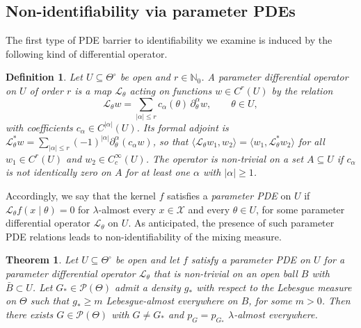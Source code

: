 \documentclass[11pt,twoside]{article} %
\newtheorem{theorem}{Theorem}
\newtheorem{definition}{Definition}
\begin{document}
\subsection{Non-identifiability via parameter PDEs}\label{sec:homogeneous}

The first type of PDE barrier to identifiability we examine is induced by the following kind of differential operator.

\begin{definition}\label{def:operator}
Let $U\subseteq\Theta^\circ$ be open and $r\in\mathbb N_0$. A \emph{parameter differential operator} on $U$ of order $r$ is a map $\mathcal L_\theta$ acting on functions $w\in C^r(U)$ by the relation
%
\begin{equation*}
    \mathcal L_\theta w=\sum_{|\alpha|\le r}c_\alpha(\theta)\,\partial^\alpha_\theta w, \qquad \theta\in U,
\end{equation*}
%
with coefficients $c_\alpha\in C^{|\alpha|}(U)$. Its formal adjoint is $\mathcal L^*_\theta w=\sum_{|\alpha|\le r}(-1)^{|\alpha|}\partial^\alpha_\theta(c_\alpha w)$, so that $\langle\mathcal L_\theta w_1,w_2\rangle=\langle w_1,\mathcal L^*_\theta w_2\rangle$ for all $w_1\in C^r(U)$ and $w_2\in C_c^\infty(U)$. The operator is \emph{non-trivial} on a set $A\subseteq U$ if $c_\alpha$ is not identically zero on $A$ for at least one $\alpha$ with $|\alpha|\ge1$.
\end{definition}

Accordingly, we say that the kernel $f$ satisfies a \emph{parameter PDE} on $U$ if $\mathcal L_\theta f(x\mid\theta)=0$ for $\lambda$-almost every $x\in\mathcal X$ and every $\theta\in U$, for some parameter differential operator $\mathcal L_\theta$ on $U$. As anticipated, the presence of such parameter PDE relations leads to non-identifiability of the mixing measure.

\begin{theorem}\label{thm:homogeneous}
Let $U\subseteq\Theta^\circ$ be open and let $f$ satisfy a parameter PDE on $U$ for a parameter differential operator $\mathcal L_\theta$ that is non-trivial on an open ball $B$ with $\bar B\subset U$. Let $G_*\in\mathcal P(\Theta)$ admit a density $g_*$ with respect to the Lebesgue measure on $\Theta$ such that $g_*\ge m$ Lebesgue-almost everywhere on $B$, for some $m>0$. Then there exists $G\in\mathcal P(\Theta)$ with $G\neq G_*$ and $p_G=p_{G_*}$ $\lambda$-almost everywhere.
\end{theorem}
\end{document}
